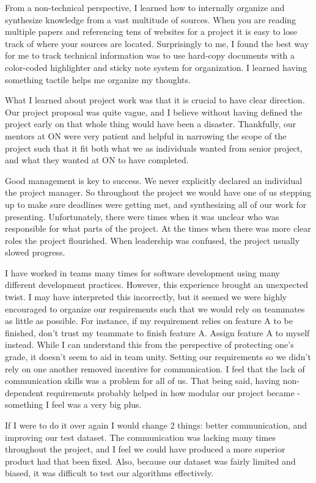 \documentclass[letterpaper,10pt,titlepage]{article}
\begin{document}
From a non-technical perspective, I learned how to internally organize and synthesize knowledge
from a vast multitude of sources. When you are reading multiple papers and referencing tens
of websites for a project it is easy to lose track of where your sources are located.
Surprisingly to me, I found the best way for me to track technical information was
to use hard-copy documents with a color-coded highlighter and sticky note system
for organization. I learned having something tactile helps me organize my thoughts.

What I learned about project work was that it is crucial to have clear direction.
Our project proposal was quite vague, and I believe without having defined the
project early on that whole thing would have been a disaster. 
Thankfully, our mentors at ON were very patient and helpful in narrowing the scope
of the project such that it fit both what we as individuals wanted from senior project,
and what they wanted at ON to have completed.

Good management is key to success. We never explicitly declared an individual the project
manager. So throughout the project we would have one of us stepping up to make sure 
deadlines were getting met, and synthesizing all of our work for presenting. 
Unfortunately, there were times when it was unclear who was responsible for what parts of the project. 
At the times when there was more clear roles the project flourished. When leadership was confused, the project usually slowed progress.

I have worked in teams many times for software development using many different development practices. 
However, this experience brought an unexpected twist.
I may have interpreted this incorrectly, but it seemed we were highly encouraged to organize 
our requirements such that we would rely on teammates as little as possible.
For instance, if my requirement relies on feature A to be finished, don't trust my teammate to finish feature A. Assign feature A to myself instead.
While I can understand this from the perspective of protecting one's grade, it doesn't seem to aid in team unity.
Setting our requirements so we didn't rely on one another removed incentive for communication.
I feel that the lack of communication skills was a problem for all of us. 
That being said, having non-dependent requirements probably helped in how modular our project became - something I feel was a very big plus.

If I were to do it over again I would change 2 things: better communication, and improving our test dataset.
The communication was lacking many times throughout the project, and I feel we could have
produced a more superior product had that been fixed. Also, because our dataset was fairly limited and biased, it was difficult to test our algorithms effectively.
\end{document}
